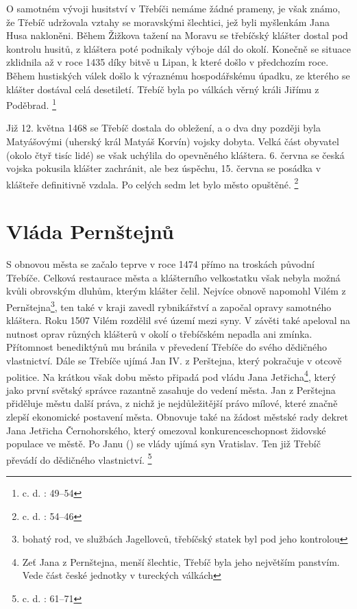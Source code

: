 \documentclass[a4paper,oneside,12p]{report}
\begin{document}
O samotném vývoji husitství v Třebíči nemáme žádné prameny, je však známo, že Třebíč udržovala vztahy se moravskými šlechtici, jež byli myšlenkám Jana Husa nakloněni.
Během Žižkova tažení na Moravu se třebíčský klášter dostal pod kontrolu husitů, z kláštera poté podnikaly výboje dál do okolí.
Konečně se situace zklidnila až v roce 1435 díky bitvě u Lipan, k které došlo v předchozím roce.
Během hustiských válek došlo k výraznému hospodářskému úpadku, ze kterého se klášter dostával celá desetiletí.
Třebíč byla po válkách věrný králi Jiřímu z Poděbrad. \footnote{c. d. : 49--54}

Již 12. května 1468 se Třebíč dostala do obležení, a o dva dny později byla Matyášovými (uherský král Matyáš Korvín) vojsky dobyta.
Velká část obyvatel (okolo čtyř tisíc lidé) se však uchýlila do opevněného kláštera.
6. června se česká vojska pokusila klášter zachránit, ale bez úspěchu, 15. června se posádka v klášteře definitivně vzdala.
Po celých sedm let bylo město opuštěné. \footnote{c. d. : 54--46}

\section{Vláda Pernštejnů}

S obnovou města se začalo teprve v roce 1474 přímo na troskách původní Třebíče.
Celková restaurace města a klášterního velkostatku však nebyla možná kvůli obrovským dluhům, kterým klášter čelil.
Nejvíce obnově napomohl Vilém z Pernštejna\footnote{bohatý rod, ve službách Jagellovců, třebíčský statek byl pod jeho kontrolou}, ten také v kraji zavedl rybnikářství a započal opravy samotného kláštera.
Roku 1507 Vilém rozdělil své území mezi syny. V závěti také apeloval na nutnost oprav různých klášterů v okolí o třebíčském nepadla ani zmínka.
Přítomnost benediktýnů mu bránila v převedení Třebíče do svého dědičného vlastnictví.
Dále se Třebíče ujímá Jan IV. z Perštejna, který pokračuje v otcově politice.
Na krátkou však dobu město připadá pod vládu Jana Jetřicha\footnote{Zeť Jana z Pernštejna, menší šlechtic, Třebíč byla jeho největším panstvím. Vede část české jednotky v tureckých válkách}, který jako první světský správce razantně zasahuje do vedení města.
Jan z Perštejna přiděluje městu další práva, z nichž je nejdůležitější právo mílové, které značně zlepší ekonomické postavení města.
Obnovuje také na žádost městské rady dekret Jana Jetřicha Černohorského, který omezoval konkurenceschopnost židovské populace ve městě.
Po Janu () se vlády ujímá syn Vratislav.
Ten již Třebíč převádí do dědičného vlastnictví. \footnote{c. d. : 61--71}
\end{document}
